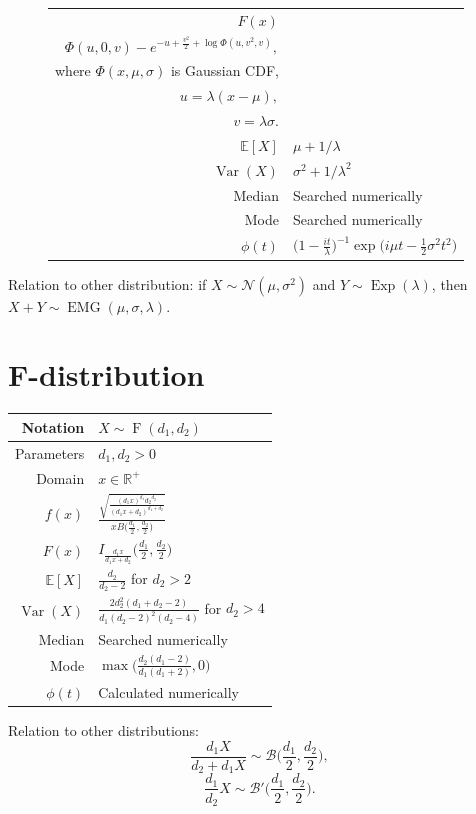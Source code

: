 \documentclass[a4paper,11pt]{article}
\theoremstyle{plain}
\theoremstyle{definition}
\newcommand{\ME}{\mathbb{E}}
\newcommand{\MR}{\mathbb{R}}
\newcommand{\Var}{\operatorname{Var}}
\begin{document}
\begin{figure}[!htb]
\begin{minipage}{0.4\textwidth}
\begin{tabular}{| r | l |}
			\hline
			$F(x)$ &\pbox{\linewidth}{$ $ \\ $ \Phi(u,0,v)-e^{ -u + \frac{v^2}{2} +\log \Phi(u, v^2, v) }, $\\ where  $\Phi(x, \mu, \sigma)$ is Gaussian CDF, \\ $u=\lambda(x-\mu),$ \\ $v=\lambda \sigma$. } \\
			\hline
			$\ME[X]$ & $ \mu + 1 / \lambda$ \\
			\hline
			$\Var(X)$ & $\sigma^2 + 1/\lambda^2$ \\
			\hline
			Median & Searched numerically \\
			\hline
			Mode & Searched numerically \\
			\hline
			$\phi(t)$ & $ \big(1-\frac{it}{\lambda} \big)^{-1}  \exp \big(i\mu t - \frac{1}{2} \sigma^2 t^2 \big) $ \\
			\hline
		\end{tabular}
	\end{minipage}
\end{figure}
    Relation to other distribution: if $X \sim \mathcal{N}(\mu, \sigma^2)$ and $Y \sim \operatorname{Exp}(\lambda)$, then $X + Y \sim \operatorname{EMG}(\mu, \sigma, \lambda)$.
	
	
	\pagebreak
	\section{F-distribution}
		\begin{center}
			\begin{tabular}{| r | l |}
				\hline
				Notation & $X \sim \operatorname{F}(d_1, d_2)$ \\
				\hline
				Parameters & $d_1, d_2 > 0$ \\
				\hline
				Domain & $x \in \MR^+$  \\
				\hline
				$f(x)$ & $\frac{\sqrt{\frac{(d_1 x)^{d_1} {d_2}^{d_2} }{(d_1x+d_2)^{d_1+d_2}}}}{x B\Big(\frac{d_1}{2},\frac{d_2}{2}\Big)}  $ \\
				\hline
				$F(x)$ & $ I_{\frac{d_1x}{d_1x+d_2}}\Big(\frac{d_1}{2},\frac{d_2}{2}\Big) $\\
				\hline
				$\ME[X]$ & $ \frac{d_2}{d_2-2}$ for $ d_2 > 2 $ \\
				\hline
				$\Var(X)$ & $\frac{2d_2^2(d_1+d_2-2)}{d_1(d_2-2)^2(d_2-4)}$ for $d_2 > 4$ \\
				\hline
				Median & Searched numerically \\
				\hline
				Mode & $\max\Big(\frac{d_2(d_1-2)}{d_1(d_1+2)}, 0\Big)$ \\
				\hline
				$\phi(t)$ & Calculated numerically \\
				\hline
			\end{tabular}
		\end{center}
		Relation to other distributions:
		\[
		\frac{d_1X}{d_2 + d_1X} \sim \mathcal{B}\bigg(\frac{d_1}{2}, \frac{d_2}{2} \bigg),
		\]
		\[
		\frac{d_1}{d_2}X \sim \mathcal{B}'\bigg(\frac{d_1}{2}, \frac{d_2}{2} \bigg).
		\]
		
\end{document}
